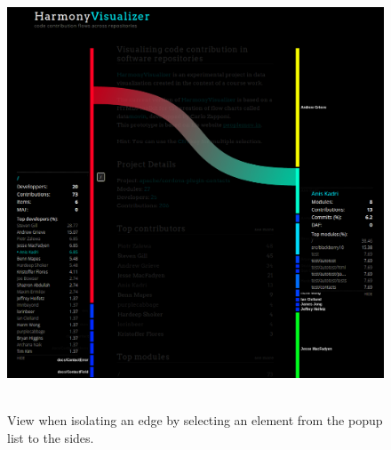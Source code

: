 \begin{figure}[H]
\centering
\includegraphics[width=1\textwidth]{./resources/visualiser_single_edge.png}~
\caption{View when isolating an edge by selecting an element from the popup list to the sides.}
\label{fig:visualiser_single_edge}
\end{figure}